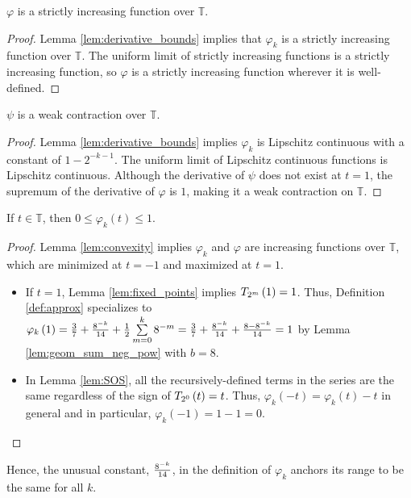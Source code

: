 \begin{lemma}
  \label{lem:increasing}
  $\varphi$ is a strictly increasing function over $\mathbb{T}$.
\end{lemma}

\begin{proof}
  Lemma \ref{lem:derivative_bounds} implies that $\varphi_k$ is a strictly increasing function over $\mathbb{T}$. The uniform limit of strictly increasing functions is a strictly increasing function, so $\varphi$ is a strictly increasing function wherever it is well-defined.
\end{proof}

\begin{lemma}
  \label{lem:contraction}
  $\psi$ is a weak contraction over $\mathbb{T}$.
\end{lemma}

\begin{proof}
  Lemma \ref{lem:derivative_bounds} implies $\varphi_k$ is Lipschitz continuous with a constant of $1 - 2^{-k - 1}$. The uniform limit of Lipschitz continuous functions is Lipschitz continuous. Although the derivative of $\psi$ does not exist at $t = 1$, the supremum of the derivative of $\varphi$ is $1$, making it a weak contraction on $\mathbb{T}$.
\end{proof}

\begin{lemma}
  \label{lem:range}
  If $t \in \mathbb{T}$, then $0 \leq \varphi_k\left(t\right) \leq 1$.
\end{lemma}

\begin{proof}
  Lemma \ref{lem:convexity} implies $\varphi_k$ and $\varphi$ are increasing functions over $\mathbb{T}$, which are minimized at $t = -1$ and maximized at $t = 1$.
  \begin{itemize}
      \item If $t = 1$, Lemma \ref{lem:fixed_points} implies $\TT[1]{m} = 1$. Thus, Definition \ref{def:approx} specializes to $\varphi_k\left(1\right) = \frac{3}{7} + \frac{8^{-k}}{14} + \frac{1}{2} \sum\limits_{m = 0}^k 8^{-m} = \frac{3}{7} + \frac{8^{-k}}{14} + \frac{8 - 8^{-k}}{14} = 1$ by Lemma \ref{lem:geom_sum_neg_pow} with $b = 8$.
      \item In Lemma \ref{lem:SOS}, all the recursively-defined terms in the series are the same regardless of the sign of $\TT[t]{0} = t$. Thus, $\varphi_k\left(-t\right) = \varphi_k\left(t\right) - t$ in general and in particular, $\varphi_k\left(-1\right) = 1 - 1 = 0$. 
  \end{itemize}
  
\end{proof}
\noindent Hence, the unusual constant, $\frac{8^{-k}}{14}$, in the definition of $\varphi_k$ anchors its range to be the same for all $k$.

